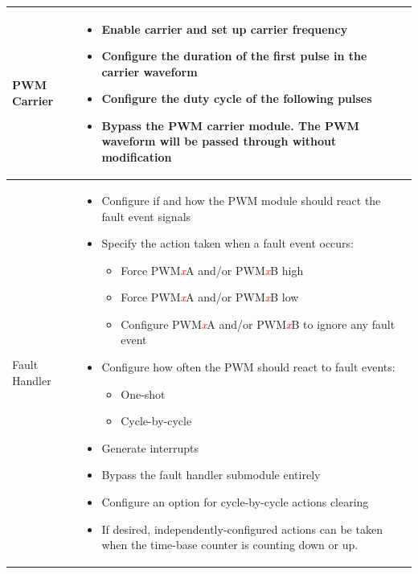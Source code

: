 \begin{longtable}[c]{|m{5cm}|m{10cm}|}
    PWM Carrier &\vspace{-1em}
    \begin{itemize}
        \item Enable carrier and set up carrier frequency
        \item Configure the duration of the first pulse in the carrier waveform
        \item Configure the duty cycle of the following pulses
        \item Bypass the PWM carrier module. The PWM waveform will be passed through without modification\vspace{-1em}
    \end{itemize}\\\hline
    
    Fault Handler &
    \begin{itemize} \vspace{-1em}   
        \item Configure if and how the PWM module should react the fault event signals
        \item Specify the action taken when a fault event occurs:
        \begin{itemize}
            \item Force PWM\textcolor{red}{\it{x}}A and/or PWM\textcolor{red}{\it{x}}B high
            \item Force PWM\textcolor{red}{\it{x}}A and/or PWM\textcolor{red}{\it{x}}B low
            \item Configure PWM\textcolor{red}{\it{x}}A and/or PWM\textcolor{red}{\it{x}}B to ignore any fault event
        \end{itemize}
        \item Configure how often the PWM should react to fault events:
        \begin{itemize}
            \item One-shot
            \item Cycle-by-cycle
        \end{itemize}
        \item Generate interrupts
        \item Bypass the fault handler submodule entirely
        \item Configure an option for cycle-by-cycle actions clearing
        \item If desired, independently-configured actions can be taken when the time-base counter is counting down or up.\vspace{-1em}

    \end{itemize}\\\hline
    
\end{longtable}

